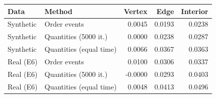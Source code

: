 \begin{tabular}{llrrr}
\toprule
Data & Method & Vertex & Edge & Interior\\
\midrule
Synthetic & Order events & 0.0045 & 0.0193 & 0.0238\\
Synthetic & Quantities (5000 it.) & 0.0000 & 0.0238 & 0.0287\\
Synthetic & Quantities (equal time) & 0.0066 & 0.0367 & 0.0363\\
Real (E6) & Order events & 0.0100 & 0.0306 & 0.0337\\
Real (E6) & Quantities (5000 it.) & -0.0000 & 0.0293 & 0.0403\\
Real (E6) & Quantities (equal time) & 0.0048 & 0.0413 & 0.0496\\
\bottomrule
\end{tabular}
